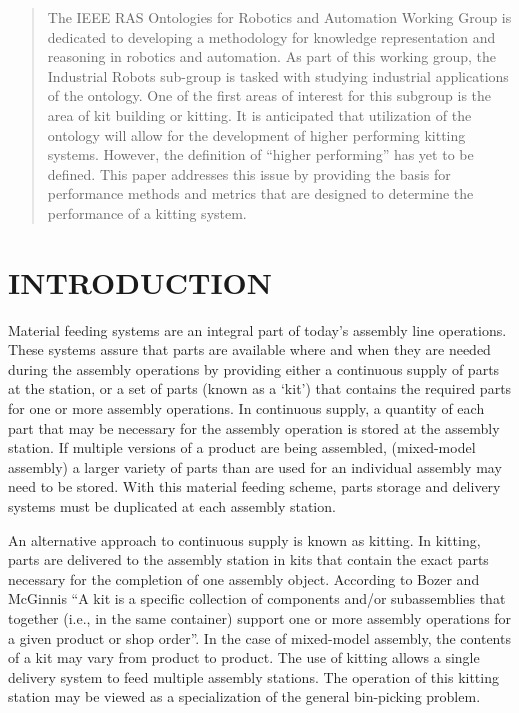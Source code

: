 



%
\maketitle
\thispagestyle{empty}
\pagestyle{empty}


\begin{abstract}

The IEEE RAS Ontologies for Robotics and Automation Working Group is dedicated to
developing a methodology for knowledge representation and reasoning in robotics
and automation. As part of this working group, the Industrial Robots sub-group is
tasked with studying industrial applications of the ontology. One of the first
areas of interest for this subgroup is the area of kit building or kitting.
It is anticipated that utilization of the ontology will allow for the development
of higher performing kitting systems. However, the definition of ``higher performing''
has yet to be defined. This paper addresses this issue by providing the basis
for performance methods and metrics that are designed to
determine the performance of a kitting system.
\end{abstract}


\section{INTRODUCTION}
Material feeding systems are an integral part of today's assembly line operations.
These systems assure that parts are available where and when
they are needed during the assembly operations by providing either a continuous
supply of parts at the station, or a set of parts (known
as a `kit') that contains the required parts for one or more assembly operations.
In continuous supply, a quantity of each part that
may be necessary for the assembly operation is stored at the assembly station.
If multiple versions of a product are being assembled, (mixed-model assembly)
a larger variety of parts than are used for an individual assembly may need
to be stored. With this material feeding scheme, parts
storage and delivery systems must be duplicated at each assembly station.

An alternative approach to continuous supply is known as kitting. In kitting,
parts are delivered to the assembly station in kits that contain
the exact parts necessary for the completion of one assembly object.
According to Bozer and McGinnis \cite{Bozer1992} ``A kit is a specific
collection of components and/or subassemblies that together
(i.e., in the same container) support one or more assembly
operations for a given product or shop order''. In the case of mixed-model
assembly, the contents of a kit may vary from product to product.
The use of kitting allows a single delivery system to feed
multiple assembly stations. The operation of this kitting
station may be viewed as a specialization of the general bin-picking problem.

